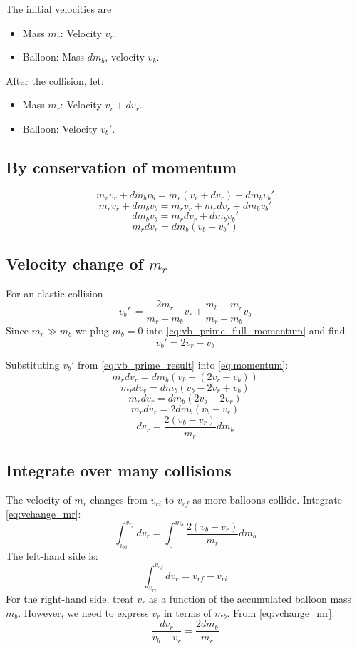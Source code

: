 \documentclass{article}
\begin{document}
The initial velocities are
\begin{itemize}
\item Mass \( m_r \): Velocity \( v_r \).
\item Balloon: Mass \( dm_b \), velocity \( v_b \).
\end{itemize}
After the collision, let:
\begin{itemize}
    \item Mass \( m_r \): Velocity \( v_r + dv_r \).
    \item Balloon: Velocity \( v_b' \).
\end{itemize}
\subsection{By conservation of momentum} \[
m_r v_r + dm_b v_b = m_r (v_r + dv_r) + dm_b v_b'
\]
\[
m_r v_r + dm_b v_b = m_r v_r + m_r dv_r + dm_b v_b'
\]
\[
dm_b v_b = m_r dv_r + dm_b v_b'
\]
\begin{equation}
m_r dv_r = dm_b (v_b - v_b') \label{eq:momentum}
\end{equation}

\subsection[Velocity change of rocket mass]{Velocity change of \(m_r\)}
For an elastic collision
\begin{equation}
    v_b'\ = \frac{2m_r}{m_r+m_b}v_r + \frac{m_b-m_r}{m_r+m_b}v_b \label{eq:vb_prime_full_momentum}
\end{equation}
Since \(m_r \gg m_b\)   we plug \(m_b = 0\)  into \autoref{eq:vb_prime_full_momentum} and find 
\begin{equation}
v_b' = 2v_r - v_b  \label{eq:vb_prime_result}
\end{equation}      

Substituting \(v_b'\) from  \autoref{eq:vb_prime_result} into \autoref{eq:momentum}:
\[
m_r dv_r = dm_b (v_b - (2 v_r - v_b))
\]
\[
m_r dv_r = dm_b (v_b - 2 v_r + v_b)
\]
\[
m_r dv_r = dm_b (2 v_b - 2 v_r)
\]
\[
m_r dv_r = 2 dm_b (v_b - v_r)
\]
\begin{equation}
dv_r = \frac{2 (v_b - v_r)}{m_r} dm_b \label{eq:vchange_mr}
\end{equation}

\subsection{Integrate over many collisions}
The velocity of \( m_r \) changes from \( v_{ri} \) to \( v_{rf} \) as more balloons collide. Integrate \autoref{eq:vchange_mr}:
\[
\int_{v_{ri}}^{v_{rf}} dv_r = \int_0^{m_b} \frac{2 (v_b - v_r)}{m_r} dm_b
\]
The left-hand side is:
\[
\int_{v_{ri}}^{v_{rf}} dv_r = v_{rf} - v_{ri}
\]
For the right-hand side, treat \( v_r \) as a function of the accumulated balloon mass \( m_b \). However, we need to express \( v_r \) in terms of \( m_b \). From \autoref{eq:vchange_mr}:
\begin{equation}
\frac{dv_r}{v_b - v_r} = \frac{2 dm_b}{m_r}\label{eq:dvr_velocity_relation}
\end{equation}
\end{document}
